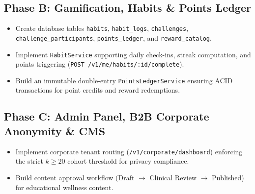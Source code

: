 \documentclass[11pt,a4paper]{article}
\begin{document}
\subsection{Phase B: Gamification, Habits \& Points Ledger}
\begin{itemize}[leftmargin=1.5em]
    \item Create database tables \texttt{habits}, \texttt{habit\_logs}, \texttt{challenges}, \texttt{challenge\_participants}, \texttt{points\_ledger}, and \texttt{reward\_catalog}.
    \item Implement \texttt{HabitService} supporting daily check-ins, streak computation, and points triggering (\texttt{POST /v1/me/habits/:id/complete}).
    \item Build an immutable double-entry \texttt{PointsLedgerService} ensuring ACID transactions for point credits and reward redemptions.
\end{itemize}

\subsection{Phase C: Admin Panel, B2B Corporate Anonymity \& CMS}
\begin{itemize}[leftmargin=1.5em]
    \item Implement corporate tenant routing (\texttt{/v1/corporate/dashboard}) enforcing the strict $k \ge 20$ cohort threshold for privacy compliance.
    \item Build content approval workflow (Draft $\to$ Clinical Review $\to$ Published) for educational wellness content.
\end{itemize}
\end{document}
